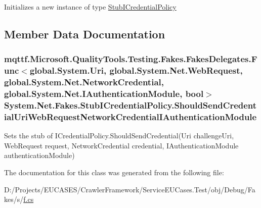 Initializes a new instance of type \hyperlink{class_system_1_1_net_1_1_fakes_1_1_stub_i_credential_policy}{Stub\-I\-Credential\-Policy}



\subsection{Member Data Documentation}
\hypertarget{class_system_1_1_net_1_1_fakes_1_1_stub_i_credential_policy_a64fb667a7daa8a451564ca6f5f0ef308}{
\subsubsection[{Should\-Send\-Credential\-Uri\-Web\-Request\-Network\-Credential\-I\-Authentication\-Module}]{\setlength{\rightskip}{0pt plus 5cm}mqttf.\-Microsoft.\-Quality\-Tools.\-Testing.\-Fakes.\-Fakes\-Delegates.\-Func$<$global.\-System.\-Uri, global.\-System.\-Net.\-Web\-Request, global.\-System.\-Net.\-Network\-Credential, global.\-System.\-Net.\-I\-Authentication\-Module, bool$>$ System.\-Net.\-Fakes.\-Stub\-I\-Credential\-Policy.\-Should\-Send\-Credential\-Uri\-Web\-Request\-Network\-Credential\-I\-Authentication\-Module}}\label{class_system_1_1_net_1_1_fakes_1_1_stub_i_credential_policy_a64fb667a7daa8a451564ca6f5f0ef308}


Sets the stub of I\-Credential\-Policy.\-Should\-Send\-Credential(\-Uri challenge\-Uri, Web\-Request request, Network\-Credential credential, I\-Authentication\-Module authentication\-Module)



The documentation for this class was generated from the following file\-:\begin{DoxyCompactItemize}
\item 
D\-:/\-Projects/\-E\-U\-C\-A\-S\-E\-S/\-Crawler\-Framework/\-Service\-E\-U\-Cases.\-Test/obj/\-Debug/\-Fakes/s/\hyperlink{s_2f_8cs}{f.\-cs}\end{DoxyCompactItemize}
